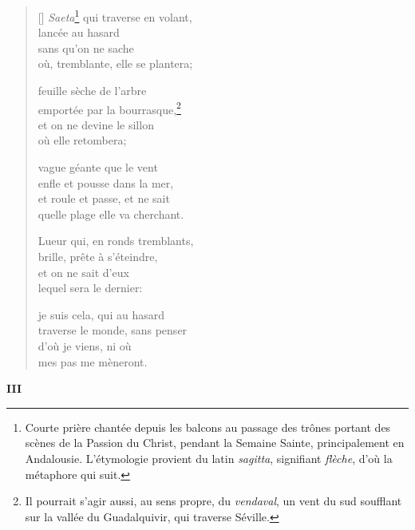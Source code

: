 \documentclass[a4paper,12pt]{book}
\begin{document}
\begin{verse}[\versewidth]
  \emph{Saeta}\footnote{Courte prière chantée
  depuis les balcons au passage des trônes portant des scènes de la
  Passion du Christ, pendant la Semaine Sainte, principalement en
  Andalousie. L'étymologie provient du latin \emph{sagitta},
  signifiant \emph{flèche}, d'où la métaphore qui suit.} qui traverse en volant, \\
  lancée au hasard \\
  sans qu'on ne sache \\
  où, tremblante, elle se plantera;

  feuille sèche de l'arbre \\
  emportée par la bourrasque,\footnote{Il pourrait s'agir aussi, au
  sens propre, du \emph{vendaval}, un vent du sud soufflant sur la
  vallée du Guadalquivir, qui traverse Séville.} \\
  et on ne devine le sillon \\
  où elle retombera;

  vague géante que le vent \\
  enfle et pousse dans la mer, \\
  et roule et passe, et ne sait \\
  quelle plage elle va cherchant.

  Lueur qui, en ronds tremblants, \\
  brille, prête à s'éteindre, \\
  et on ne sait d'eux \\
  lequel sera le dernier:

  je suis cela, qui au hasard \\
  traverse le monde, sans penser \\
  d'où je viens, ni où \\
  mes pas me mèneront.
\end{verse}

\bigskip

\begin{center}
  \textbf{III}
\end{center}

\settowidth{\versewidth}{comme au travers d'un tulle,}
\end{document}
